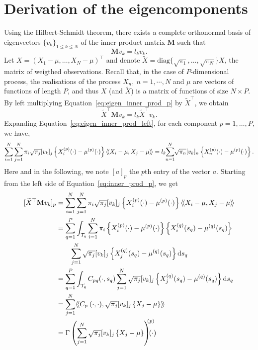 \section{Derivation of the eigencomponents} %
\label{sec:derivation_of_the_eigencomponents}

Using the Hilbert-Schmidt theorem, there exists a complete orthonormal basis of eigenvectors $\{v_k\}_{1 \leq k \leq N}$ of the inner-product matrix $\mathbf{M}$ such that
\begin{equation}\label{eq:eigen_inner_prod_p}
    \mathbf{M}v_k = l_kv_k.
\end{equation}
Let $X = \left(X_1 - \mu, \dots, X_N - \mu\right)^\top$ and denote $\widetilde{X} = \text{diag}\{\sqrt{\pi_1}, \dots, \sqrt{\pi_N}\}X$, the matrix of weigthed observations. Recall that, in the case of $P$-dimensional process, the realisations of the process $X_n,~n = 1, \cdots, N$ and $\mu$ are vectors of functions of length $P$, and thus $X$ (and $\widetilde{X}$) is a matrix of functions of size $N \times P$. By left multiplying Equation~\eqref{eq:eigen_inner_prod_p} by $\widetilde{X}^\top$, we obtain
\begin{equation}\label{eq:eigen_inner_prod_left}
    \widetilde{X}^\top \mathbf{M} v_k = l_k \widetilde{X}^\top v_k.
\end{equation} 
Expanding Equation~\eqref{eq:eigen_inner_prod_left}, for each component $p = 1, \dots, P$, we have,
\begin{equation}\label{eq:inner_prod_p}
    \sum_{i = 1}^N \sum_{j = 1}^N \pi_i \sqrt{\pi_j}[v_{k}]_j\left\{X_i^{(p)}(\cdot) - \mu^{(p)}(\cdot)\right\}\langle\!\langle X_i - \mu, X_j - \mu\rangle\!\rangle = l_k \mkern-5mu\sum_{n = 1}^N \mkern-4mu\sqrt{\pi_n}[v_{k}]_n\left\{X_n^{(p)}(\cdot) - \mu^{(p)}(\cdot)\right\}.
\end{equation}
Here and in the following, we note $[a]_p$ the $p$th entry of the vector $a$. Starting from the left side of Equation~\eqref{eq:inner_prod_p}, we get
\begin{align}\label{eq:inner_prod_p_left}
[\widetilde{X}^\top \mathbf{M} v_k]_p &= \sum_{i = 1}^N \sum_{j = 1}^N \pi_i \sqrt{\pi_j} [v_{k}]_j \left\{X_i^{(p)}(\cdot) - \mu^{(p)}(\cdot)\right\}\inH{X_i - \mu}{X_j - \mu}\\
&= \sum_{q = 1}^P \int_{\TT{q}} \sum_{i = 1}^N \pi_i\left\{X_i^{(p)}(\cdot) - \mu^{(p)}(\cdot)\right\} \left\{X_i^{(q)}(s_q) - \mu^{(q)}(s_q)\right\}  \\
&\quad\quad \sum_{j = 1}^N \sqrt{\pi_j}[v_{k}]_j \left\{X_j^{(q)}(s_q) - \mu^{(q)}(s_q)\right\} \dd s_q \\
&= \sum_{q = 1}^P \int_{\TT{q}} C_{pq}(\cdot, s_q)\sum_{j = 1}^N \sqrt{\pi_j}[v_{k}]_j \left\{X_j^{(q)}(s_q) - \mu^{(q)}(s_q)\right\} \dd s_q \\
&= \sum_{j = 1}^N \inH{C_{p \cdot}(\cdot, \cdot)}{\sqrt{\pi_j}[v_{k}]_j \left\{X_j - \mu\right\}} \\
&= \Gamma\left(\sum_{j = 1}^N \sqrt{\pi_j}[v_{k}]_j \left\{X_j - \mu\right\} \right)^{\mkern-9mu(p)}\mkern-18mu(\cdot)
\end{align}
